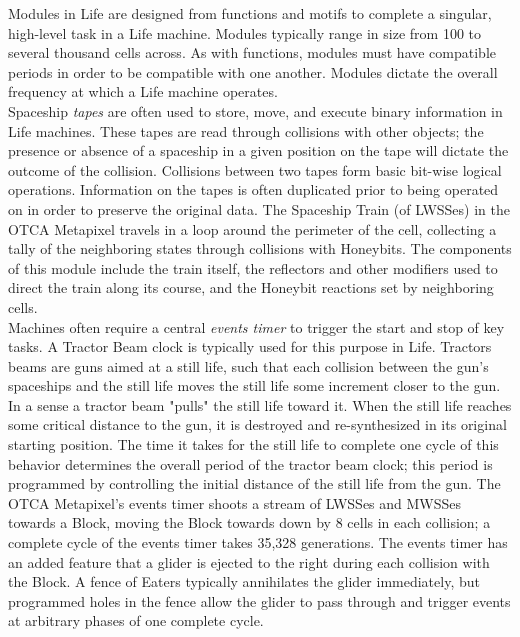 {Modules in Life are designed from functions and motifs to complete a singular, high-level task in a Life machine.  Modules typically range in size from 100 to several thousand cells across.  As with functions, modules must have compatible periods in order to be compatible with one another.  Modules dictate the overall frequency at which a Life machine operates.\\

Spaceship \textit{tapes} are often used to store, move, and execute binary information in Life machines.  These tapes are read through collisions with other objects; the presence or absence of a spaceship in a given position on the tape will dictate the outcome of the collision.  Collisions between two tapes form basic bit-wise logical operations.  Information on the tapes is often duplicated prior to being operated on in order to preserve the original data.  The Spaceship Train (of LWSSes) in the OTCA Metapixel travels in a loop around the perimeter of the cell, collecting a tally of the neighboring states through collisions with Honeybits.  The components of this module include the train itself, the reflectors and other modifiers used to direct the train along its course, and the Honeybit reactions set by neighboring cells.\\

Machines often require a central \textit{events timer} to trigger the start and stop of key tasks.  A Tractor Beam clock is typically used for this purpose in Life.  Tractors beams are guns aimed at a still life, such that each collision between the gun's spaceships and the still life moves the still life some increment closer to the gun.  In a sense a tractor beam "pulls" the still life toward it.  When the still life reaches some critical distance to the gun, it is destroyed and re-synthesized in its original starting position.  The time it takes for the still life to complete one cycle of this behavior determines the overall period of the tractor beam clock; this period is programmed by controlling the initial distance of the still life from the gun.  The OTCA Metapixel's events timer shoots a stream of LWSSes and MWSSes towards a Block, moving the Block towards down by 8 cells in each collision; a complete cycle of the events timer takes 35,328 generations.  The events timer has an added feature that a glider is ejected to the right during each collision with the Block.  A fence of Eaters typically annihilates the glider immediately, but programmed holes in the fence allow the glider to pass through and trigger events at arbitrary phases of one complete cycle.\\

}
